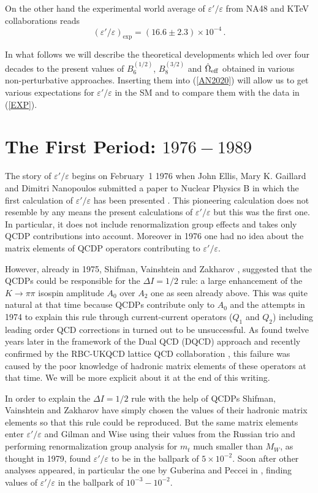 \documentclass[12pt,a4paper]{article}
\newcommand{\bsi}{B_6^{(1/2)}}
\newcommand{\bei}{B_8^{(3/2)}}
\def\epe{\varepsilon'/\varepsilon}
\newcommand{\be}{\begin{equation}}
\newcommand{\ee}{\end{equation}}
\begin{document}
On the other hand 
 the experimental world average of $\epe$ 
from NA48 \cite{Batley:2002gn} and KTeV
\cite{AlaviHarati:2002ye,Abouzaid:2010ny} collaborations reads
\be\label{EXP}
(\epe)_\text{exp}=(16.6\pm 2.3)\times 10^{-4} \,.
\ee

In what follows we will describe the theoretical developments
which led over four decades to the
present values of $\bsi$, $\bei$ and  $\hat\Omega_{\rm eff}$ obtained
in various non-perturbative approaches. Inserting them
into (\ref{AN2020}) will allow us to get various expectations for $\epe$
in the SM and to compare them with the data in (\ref{EXP}).

\boldmath
\section{The First Period: $1976-1989$}\label{P1}
\unboldmath
The story of $\epe$ begins on February~1  1976 when John Ellis, Mary K. Gaillard and Dimitri
Nanopoulos submitted a paper to Nuclear Physics B in which the first
calculation of $\epe$ has been presented
\cite{Ellis:1976fn}. This pioneering calculation does not resemble by any means the
present calculations of $\epe$ but this was the first one. In particular, it does not
include renormalization group effects and takes only QCDP
contributions into account. Moreover in 1976 one had no idea about the matrix elements
of QCDP operators contributing to $\epe$.

However, already in 1975, Shifman, Vainshtein and Zakharov \cite{Shifman:1975tn}, suggested that the QCDPs could be responsible for the $\Delta I=1/2$ rule: a large
enhancement of the $K\to\pi\pi$ isospin amplitude $A_0$ over $A_2$ one as seen already above. This was quite
natural at that time because QCDPs contribute only to $A_0$ and the
attempts in 1974 to explain this rule through current-current operators ($Q_1$ and $Q_2$)
including leading order QCD corrections in \cite{Altarelli:1974exa,Gaillard:1974nj} turned out to be unsuccessful. As found twelve years later 
in the framework of the Dual QCD (DQCD) approach \cite{Bardeen:1986vz} and recently confirmed by the RBC-UKQCD lattice QCD collaboration \cite{Abbott:2020hxn},  this failure was caused by 
the poor knowledge of hadronic matrix elements of these operators
at that time. We will be more explicit about it at the end of this writing.

In order to explain the  $\Delta I=1/2$ rule with the help of QCDPs
Shifman, Vainshtein and Zakharov have simply chosen the values of their
hadronic matrix elements so that this rule could be reproduced.
But the same matrix elements enter $\epe$ and Gilman and Wise 
\cite{Gilman:1978wm} using their values from the Russian trio and performing renormalization
group analysis for $m_t$ much smaller than $M_W$, as thought in 1979,
found $\epe$ to be in the ballpark of $5\times 10^{-2}$. Soon after other analyses appeared, in particular the one by Guberina and Peccei in \cite{Guberina:1979ix}, finding values of $\epe$  in the ballpark of $10^{-3}-10^{-2}$.
\end{document}

